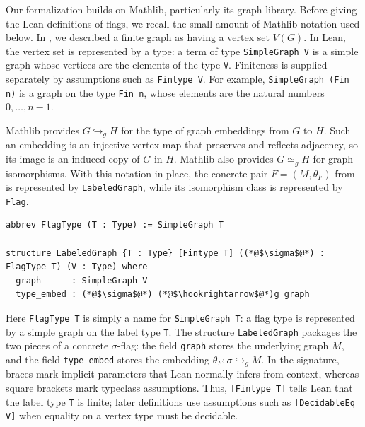 \documentclass{article}
\newcommand{\lean}[1]{\texttt{#1}}
\begin{document}
Our formalization builds on Mathlib, particularly its graph library.  Before
giving the Lean definitions of flags, we recall the small amount of Mathlib
notation used below.  In , we described a finite graph as
having a vertex set $V(G)$.  In Lean, the vertex set is represented by a type:
a term of type \lean{SimpleGraph V} is a simple graph whose vertices are the
elements of the type \lean{V}.  Finiteness is supplied separately by
assumptions such as \lean{Fintype V}.  For example,
\lean{SimpleGraph (Fin n)} is a graph on the type \lean{Fin n}, whose elements
are the natural numbers \(0,\ldots,n-1\).

Mathlib provides ${G\hookrightarrow_g H}$ for the type of graph embeddings
from $G$ to $H$.  Such an embedding is an injective vertex map that
preserves and reflects adjacency, so its image is an induced copy of $G$
in $H$.  Mathlib also provides $G\simeq_g H$ for graph isomorphisms.
With this notation in place, the concrete pair $F=(M,\theta_F)$ from
 is represented by \lean{LabeledGraph}, while its
isomorphism class is represented by \lean{Flag}.

\begin{lstlisting}
abbrev FlagType (T : Type) := SimpleGraph T

structure LabeledGraph {T : Type} [Fintype T] ((*@$\sigma$@*) : FlagType T) (V : Type) where
  graph      : SimpleGraph V
  type_embed : (*@$\sigma$@*) (*@$\hookrightarrow$@*)g graph
\end{lstlisting}
Here \lean{FlagType T} is simply a name for \lean{SimpleGraph T}: a flag type
is represented by a simple graph on the label type \lean{T}.  The structure
\lean{LabeledGraph} packages the two pieces of a concrete $\sigma$-flag: the
field \lean{graph} stores the underlying graph $M$, and the field
\lean{type\_embed} stores the embedding
$\theta_F:\sigma\hookrightarrow_g M$.  In the signature, braces mark
implicit parameters that Lean normally infers from context, whereas square
brackets mark typeclass assumptions.  Thus, \lean{[Fintype T]} tells Lean that
the label type \lean{T} is finite; later definitions use assumptions such as
\lean{[DecidableEq V]} when equality on a vertex type must be decidable.
\end{document}
